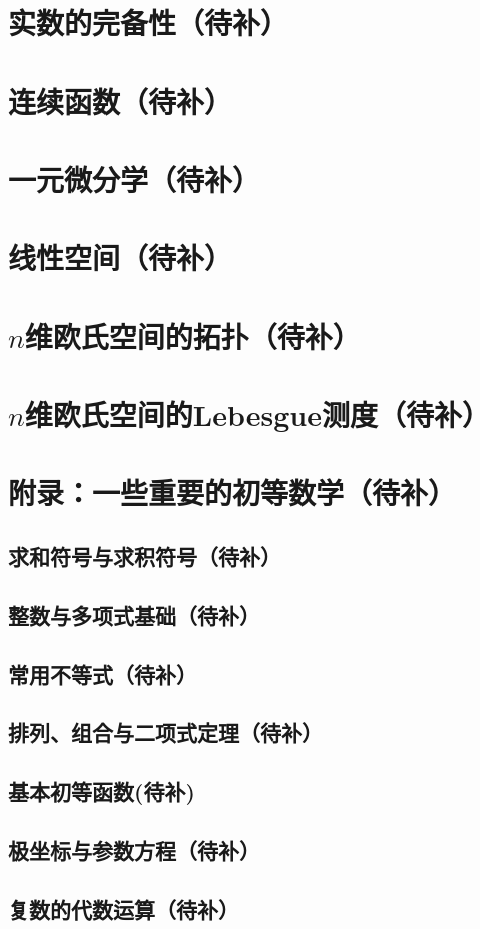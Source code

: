 \documentclass[a4paper, 11pt]{article} %
\begin{document}
\section{实数的完备性（待补）}
\section{连续函数（待补）}
\section{一元微分学（待补）}
\section{线性空间（待补）}
\section{$n$维欧氏空间的拓扑（待补）}
\section{$n$维欧氏空间的Lebesgue测度（待补）}
\section{附录：一些重要的初等数学（待补）}
\subsection{求和符号与求积符号（待补）}
\subsection{整数与多项式基础（待补）}
\subsection{常用不等式（待补）}
\subsection{排列、组合与二项式定理（待补）}
\subsection{基本初等函数(待补)}
\subsection{极坐标与参数方程（待补）}
\subsection{复数的代数运算（待补）}


\nocite{*}

\end{document}
